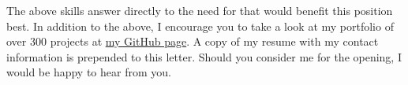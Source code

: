 The above skills answer directly to the need for \jobrequirement{} that would benefit this position best. 
In addition to the above, I encourage you to take a look at my portfolio of over 300 projects at \href{https://github.com/JacobArchambault}{my GitHub page}. A copy of my resume with my contact information is prepended to this letter. 
Should you consider me for the \position{} opening, 
I would be happy to hear from you. 